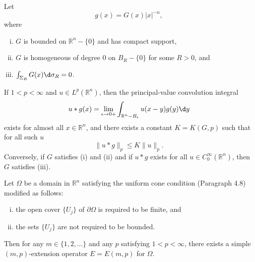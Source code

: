 \begin{theorem}
  Let
  \[ g(x) = G(x) |x|^{-n}, \]
  where
  \begin{enumerate}[(i)]
    \item $G$ is bounded on $\mathbb{R}^n-\{0\}$ and has compact support,
    \item $G$ is homogeneous of degree 0 on $B_R-\{0\}$ for some $R>0$, and
    \item $\int_{\Sigma_R} G(x) \d\sigma_R = 0$.
  \end{enumerate}
  If $1<p<\infty$ and $u\in L^p(\mathbb{R}^n)$, then the principal-value
  convolution integral
  \[ u*g(x) = \lim_{\epsilon\to 0+} \int_{\mathbb{R}^n - B_{\epsilon}}
      u(x-y) g(y) \d y \]
  exists for almost all $x\in\mathbb{R}^n$, and there exists a constant
  $K=K(G,p)$ such that for all such $u$
  \[ \|u*g\|_p \leq K\|u\|_p. \]
  Conversely, if $G$ satisfies (i) and (ii) and if $u*g$ exists for all
  $u\in C_0^{\infty}(\mathbb{R}^n)$, then $G$ satisfies (iii).
\end{theorem}


\begin{theorem}
  Let $\Omega$ be a domain in $\mathbb{R}^n$ satisfying the uniform cone
  condition (Paragraph 4.8) modified as follows:
  \begin{enumerate}[(i)]
    \item the open cover $\{U_j\}$ of $\partial\Omega$ is required to be finite, and
    \item the sets $\{U_j\}$ are not required to be bounded.
  \end{enumerate}
  Then for any $m\in\{1,2,\ldots\}$ and any $p$ satisfying $1<p<\infty$,
  there exists a simple $(m,p)$-extension operator $E=E(m,p)$ for $\Omega$.
\end{theorem}

